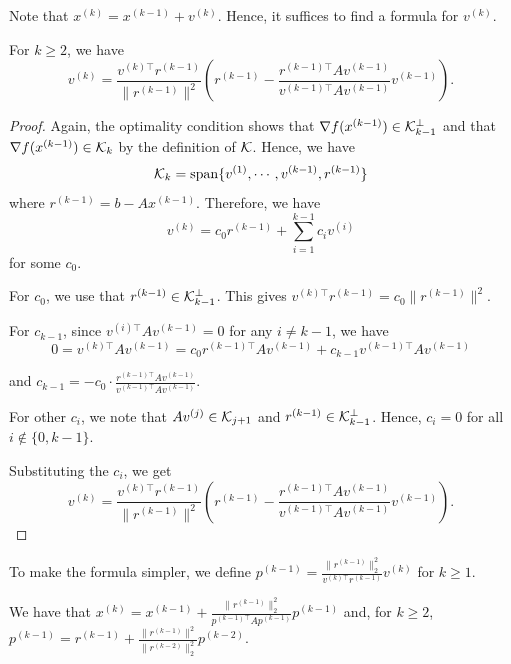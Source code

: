 Note that $x^{(k)}=x^{(k-1)}+v^{(k)}$. Hence, it suffices to find
a formula for $v^{(k)}$.
\begin{lem}
\label{lem:CG_v}For $k\ge2$, we have 
\[
v^{(k)}=\frac{v^{(k)\top}r^{(k-1)}}{\|r^{(k-1)}\|^{2}}\left(r^{(k-1)}-\frac{r^{(k-1)\top}Av^{(k-1)}}{v^{(k-1)\top}Av^{(k-1)}}v^{(k-1)}\right).
\]
\end{lem}

\begin{proof}
Again, the optimality condition shows that $\nabla f(x^{(k-1)})\in\mathcal{K}^{\perp}_{k-1}$
and that $\nabla f(x^{(k-1)})\in\mathcal{K}_{k}$ by the definition of $\mathcal{K}$.
Hence, we have
\[
\mathcal{K}_{k}=\mathrm{span}\{v^{(1)},\cdots,v^{(k-1)},r^{(k-1)}\}
\]
where $r^{(k-1)}=b-Ax^{(k-1)}$. Therefore, we have
\[
v^{(k)}=c_{0}r^{(k-1)}+\sum^{k-1}_{i=1}c_{i}v^{(i)}
\]
for some $c_{0}$. 

For $c_{0}$, we use that $r^{(k-1)}\in\mathcal{K}^{\perp}_{k-1}$. This gives
$v^{(k)\top}r^{(k-1)}=c_{0}\|r^{(k-1)}\|^{2}$.

For $c_{k-1}$, since $v^{(i)\top}Av^{(k-1)}=0$ for any $i\neq k-1$,
we have
\[
0=v^{(k)\top}Av^{(k-1)}=c_{0}r^{(k-1)\top}Av^{(k-1)}+c_{k-1}v^{(k-1)\top}Av^{(k-1)}
\]

and $c_{k-1}=-c_{0}\cdot\frac{r^{(k-1)\top}Av^{(k-1)}}{v^{(k-1)\top}Av^{(k-1)}}$. 

For other $c_{i}$, we note that $Av^{(j)}\in\mathcal{K}_{j+1}$ and $r^{(k-1)}\in\mathcal{K}^{\perp}_{k-1}$.
Hence, $c_{i}=0$ for all $i\notin\{0,k-1\}$. 

Substituting the $c_{i}$, we get
\[
v^{(k)}=\frac{v^{(k)\top}r^{(k-1)}}{\|r^{(k-1)}\|^{2}}\left(r^{(k-1)}-\frac{r^{(k-1)\top}Av^{(k-1)}}{v^{(k-1)\top}Av^{(k-1)}}v^{(k-1)}\right).
\]
\end{proof}
To make the formula simpler, we define $p^{(k-1)}=\frac{\|r^{(k-1)}\|^{2}_{2}}{v^{(k)\top}r^{(k-1)}}v^{(k)}$
for $k\ge1$.
\begin{lem}
We have that $x^{(k)}=x^{(k-1)}+\frac{\|r^{(k-1)}\|^{2}_{2}}{p^{(k-1)\top}Ap^{(k-1)}}p^{(k-1)}$
and, for $k\ge2$, $p^{(k-1)}=r^{(k-1)}+\frac{\|r^{(k-1)}\|^{2}}{\|r^{(k-2)}\|^{2}_{2}}p^{(k-2)}.$
\end{lem}

